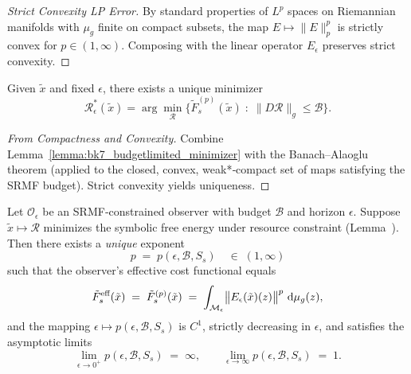 \begin{proof}[Strict Convexity LP Error]
\label{proof:bk9_strict_convexity_lp_error}
By standard properties of $L^{p}$ spaces on Riemannian manifolds with
$\mu_{g}$ finite on compact subsets, the map
$E\!\mapsto\!\lVert E\rVert_{p}^{p}$ is strictly convex
for $p\!\in\!(1,\infty)$.  Composing with the linear operator
$E_{\epsilon}$ preserves strict convexity.
\end{proof}
\begin{lemma}
\label{lemma:bk7_budgetlimited_minimizer}
Given $\tilde{x}$ and fixed $\epsilon$, there exists a unique minimizer
\[
\mathcal{R}_{\epsilon}^{*}(\tilde{x})
=\arg\!\min_{\mathcal{R}}
\bigl\{
\tilde{F}_{s}^{(p)}(\tilde{x})
\;:\;
\lVert D\mathcal{R}\rVert_{g}\le\mathcal{B}
\bigr\}.
\]
\end{lemma}
\begin{proof}[From Compactness and Convexity]
\label{proof:bk9_from_compactness_and_convexity}
Combine Lemma~\ref{lemma:bk7_budgetlimited_minimizer} with the Banach–Alaoglu theorem
(applied to the closed, convex, weak*‑compact set of maps satisfying
the SRMF budget).  Strict convexity yields uniqueness.
\end{proof}
\begin{theorem}
\label{theorem:bk7_emergent_lp_norm}
Let $\mathcal{O}_{\epsilon}$ be an SRMF‑constrained observer with
budget $\mathcal{B}$ and horizon $\epsilon$.  Suppose
$\tilde{x}\mapsto\mathcal{R}$ minimizes the symbolic free energy
under resource constraint (Lemma~).
Then there exists a \emph{unique} exponent
\[
p\;=\;p(\epsilon,\mathcal{B},S_{s})
\quad\in\;(1,\infty)
\]
such that the observer’s effective cost functional equals
\[
\tilde{F}_{s}^{\text{\rm eff}}(\tilde{x})
\;=\;
\tilde{F}_{s}^{(p)}(\tilde{x})
\;=\;
\int_{\mathcal{M}_{\epsilon}}
\bigl\lVert E_{\epsilon}(\tilde{x})(z)\bigr\rVert^{p}\,
\,\mathrm{d}\mu_{g}(z),
\]
and the mapping
$\epsilon\mapsto p(\epsilon,\mathcal{B},S_{s})$ is $C^{1}$,
strictly decreasing in $\epsilon$,
and satisfies the asymptotic limits
\[
\lim_{\epsilon\to 0^{+}} p(\epsilon,\mathcal{B},S_{s}) \;=\;\infty,
\qquad
\lim_{\epsilon\to\infty} p(\epsilon,\mathcal{B},S_{s}) \;=\;1.
\]
\end{theorem}
